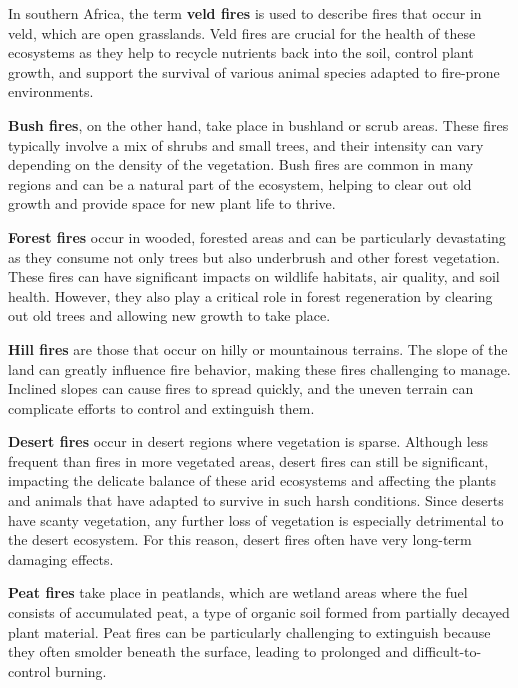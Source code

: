 \documentclass[
  12 pt,
]{Nemilov}
\begin{document}
In southern Africa, the term \textbf{veld fires} is used to describe fires that occur in veld, which are open grasslands. Veld fires are crucial for the health of these ecosystems as they help to recycle nutrients back into the soil, control plant growth, and support the survival of various animal species adapted to fire-prone environments.

\textbf{Bush fires}, on the other hand, take place in bushland or scrub areas. These fires typically involve a mix of shrubs and small trees, and their intensity can vary depending on the density of the vegetation. Bush fires are common in many regions and can be a natural part of the ecosystem, helping to clear out old growth and provide space for new plant life to thrive.

\textbf{Forest fires} occur in wooded, forested areas and can be particularly devastating as they consume not only trees but also underbrush and other forest vegetation. These fires can have significant impacts on wildlife habitats, air quality, and soil health. However, they also play a critical role in forest regeneration by clearing out old trees and allowing new growth to take place.

\textbf{Hill fires} are those that occur on hilly or mountainous terrains. The slope of the land can greatly influence fire behavior, making these fires challenging to manage. Inclined slopes can cause fires to spread quickly, and the uneven terrain can complicate efforts to control and extinguish them.

\textbf{Desert fires} occur in desert regions where vegetation is sparse. Although less frequent than fires in more vegetated areas, desert fires can still be significant, impacting the delicate balance of these arid ecosystems and affecting the plants and animals that have adapted to survive in such harsh conditions. Since deserts have scanty vegetation, any further loss of vegetation is especially detrimental to the desert ecosystem. For this reason, desert fires often have very long-term damaging effects.

\textbf{Peat fires} take place in peatlands, which are wetland areas where the fuel consists of accumulated peat, a type of organic soil formed from partially decayed plant material. Peat fires can be particularly challenging to extinguish because they often smolder beneath the surface, leading to prolonged and difficult-to-control burning.
\end{document}
